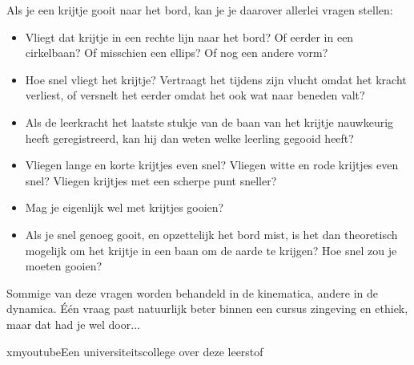 \documentclass{ximera}
\begin{document}
\begin{example}
Als je een krijtje gooit naar het bord, kan je je daarover allerlei vragen stellen:
\begin{itemize}
\item Vliegt dat krijtje in een rechte lijn naar het bord? Of eerder in een cirkelbaan? Of misschien een ellips? Of nog een andere vorm? 
\item Hoe snel vliegt het krijtje? Vertraagt het tijdens zijn vlucht omdat het kracht verliest, of versnelt het eerder omdat het ook wat naar beneden valt? 
\item Als de leerkracht het laatste stukje van de baan van het krijtje nauwkeurig heeft geregistreerd, kan hij dan weten welke leerling gegooid heeft?
\item Vliegen lange en korte krijtjes even snel? Vliegen witte en rode krijtjes even snel? Vliegen krijtjes met een scherpe punt sneller?
\item Mag je eigenlijk wel met krijtjes gooien?
\item Als je snel genoeg gooit, en opzettelijk het bord mist, is het dan theoretisch mogelijk om het krijtje in een baan om de aarde te krijgen? Hoe snel zou je moeten gooien? 
\end{itemize}  

Sommige van deze vragen worden behandeld in de kinematica, andere in de dynamica. 
Één vraag past natuurlijk beter binnen een cursus zingeving en ethiek, maar dat had je wel door... 

\end{example}

\begin{expandable}{xmyoutube}{Een universiteitscollege over deze leerstof}
\end{expandable}
\end{document}
